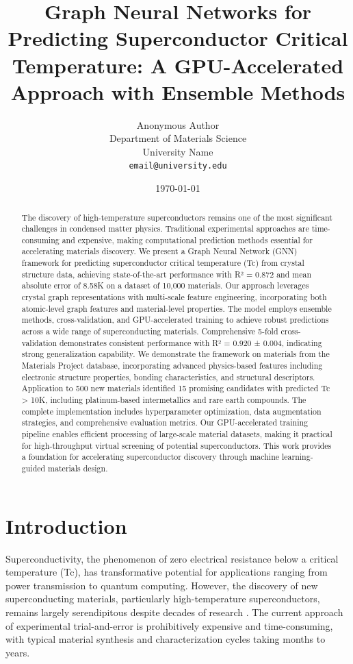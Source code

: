 \documentclass[11pt,a4paper]{article}
\title{\Large \textbf{Graph Neural Networks for Predicting Superconductor Critical Temperature: A GPU-Accelerated Approach with Ensemble Methods}}
\author{
Anonymous Author\\
Department of Materials Science\\
University Name\\
\texttt{email@university.edu}
}
\date{\today}
\begin{document}
\maketitle

\begin{abstract}
The discovery of high-temperature superconductors remains one of the most significant challenges in condensed matter physics. Traditional experimental approaches are time-consuming and expensive, making computational prediction methods essential for accelerating materials discovery. We present a Graph Neural Network (GNN) framework for predicting superconductor critical temperature (Tc) from crystal structure data, achieving state-of-the-art performance with R² = 0.872 and mean absolute error of 8.58K on a dataset of 10,000 materials. Our approach leverages crystal graph representations with multi-scale feature engineering, incorporating both atomic-level graph features and material-level properties. The model employs ensemble methods, cross-validation, and GPU-accelerated training to achieve robust predictions across a wide range of superconducting materials. Comprehensive 5-fold cross-validation demonstrates consistent performance with R² = 0.920 ± 0.004, indicating strong generalization capability. We demonstrate the framework on materials from the Materials Project database, incorporating advanced physics-based features including electronic structure properties, bonding characteristics, and structural descriptors. Application to 500 new materials identified 15 promising candidates with predicted Tc > 10K, including platinum-based intermetallics and rare earth compounds. The complete implementation includes hyperparameter optimization, data augmentation strategies, and comprehensive evaluation metrics. Our GPU-accelerated training pipeline enables efficient processing of large-scale material datasets, making it practical for high-throughput virtual screening of potential superconductors. This work provides a foundation for accelerating superconductor discovery through machine learning-guided materials design.
\end{abstract}

\section{Introduction}

Superconductivity, the phenomenon of zero electrical resistance below a critical temperature (Tc), has transformative potential for applications ranging from power transmission to quantum computing. However, the discovery of new superconducting materials, particularly high-temperature superconductors, remains largely serendipitous despite decades of research \citep{bednorz1986possible}. The current approach of experimental trial-and-error is prohibitively expensive and time-consuming, with typical material synthesis and characterization cycles taking months to years.
\end{document}

